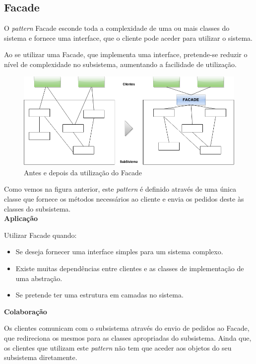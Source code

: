 \subsection{Facade}

O \textit{pattern} Facade esconde toda a complexidade de uma ou mais classes do sistema e fornece uma interface, que o cliente pode aceder  para utilizar o sistema.

Ao se utilizar uma Facade, que implementa uma interface, pretende-se reduzir o nível de complexidade no subsistema, aumentando a facilidade de utilização.\\

\begin{figure}[!h]
\centering
\includegraphics[scale=0.5]{img/facade-estrutura}
\caption{Antes e depois da utilização do Facade}
\end{figure}

Como vemos na figura anterior, este \textit{pattern} é definido através de uma única classe que fornece os métodos necessários ao cliente e envia os pedidos deste às classes do subsistema.\\

\textbf{Aplicação}

Utilizar Facade quando:

\begin{itemize}
  \item Se deseja fornecer uma interface simples para um sistema complexo.
  \item Existe muitas dependências entre clientes e as classes de implementação de uma abstração.
  \item Se pretende ter uma estrutura em camadas no sistema.\\
\end{itemize}

\textbf{Colaboração}

Os clientes comunicam com o subsistema através do envio de pedidos ao Facade, que redireciona os mesmos para as classes apropriadas do subsistema. Ainda que, os clientes que utilizam este \textit{pattern} não tem que aceder aos objetos do seu subsistema diretamente.\\

